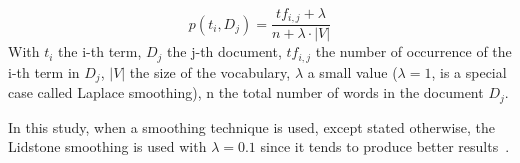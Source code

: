 \begin{definition}
  \label{def:lidstone_smoothing}
  \begin{equation}
    p(t_i, D_j) = \frac{tf_{i,j} + \lambda}{n + \lambda \cdot |V|}
  \end{equation}
  With $t_i$ the i-th term, $D_j$ the j-th document, $tf_{i,j}$ the number of occurrence of the i-th term in $D_j$, $|V|$ the size of the vocabulary, $\lambda$ a small value ($\lambda = 1$, is a special case called Laplace smoothing), n the total number of words in the document $D_j$.
\end{definition}

In this study, when a smoothing technique is used, except stated otherwise, the Lidstone smoothing is used with $\lambda = 0.1$ since it tends to produce better results~\cite{savoy_stylo}.
